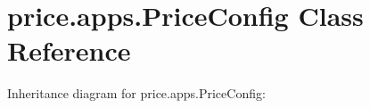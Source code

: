 \hypertarget{classprice_1_1apps_1_1PriceConfig}{}\section{price.\+apps.\+Price\+Config Class Reference}
\label{classprice_1_1apps_1_1PriceConfig}


Inheritance diagram for price.\+apps.\+Price\+Config\+:
